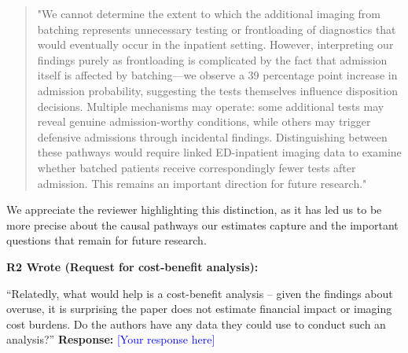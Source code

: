 \documentclass[11pt]{article}
\newenvironment{quote2}
{ \bigskip
\noindent
         \small\em
         \baselineskip=14pt
}
\newcommand{\1}{\hbox{\rm 1\kern-.35em 1}}
\begin{document}
\begin{quote}
"We cannot determine the extent to which the additional imaging from batching represents unnecessary testing or frontloading of diagnostics that would eventually occur in the inpatient setting. However, interpreting our findings purely as frontloading is complicated by the fact that admission itself is affected by batching—we observe a 39 percentage point increase in admission probability, suggesting the tests themselves influence disposition decisions. Multiple mechanisms may operate: some additional tests may reveal genuine admission-worthy conditions, while others may trigger defensive admissions through incidental findings. Distinguishing between these pathways would require linked ED-inpatient imaging data to examine whether batched patients receive correspondingly fewer tests after admission. This remains an important direction for future research."
\end{quote}

We appreciate the reviewer highlighting this distinction, as it has led us to be more precise about the causal pathways our estimates capture and the important questions that remain for future research.

\color{black}

\begin{quote2}
\textbf{R2 Wrote (Request for cost‑benefit analysis):} 

\noindent``Relatedly, what would help is a cost-benefit analysis -- given the
findings about overuse, it is surprising the paper does not estimate financial impact or
imaging cost burdens. Do the authors have any data they could use to conduct such an
analysis?” 
\end{quote2}

\noindent\textbf{Response:} \textcolor{blue}{[Your response here]}
\end{document}
